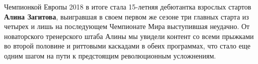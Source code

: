 Чемпионкой Европы 2018 в итоге стала 15-летняя дебютантка взрослых стартов
\textbf{Алина Загитова}, выигравшая в своем первом же сезоне три главных старта из
четырех и лишь на последующем Чемпионате Мира выступившая неудачно. От
новаторского тренерского штаба Алины мы увидели контент со всеми прыжками во
второй половине и риттовыми каскадами в обеих программах, что стало еще одним
шагом на пути к предстоящим революционным усложнениям.
